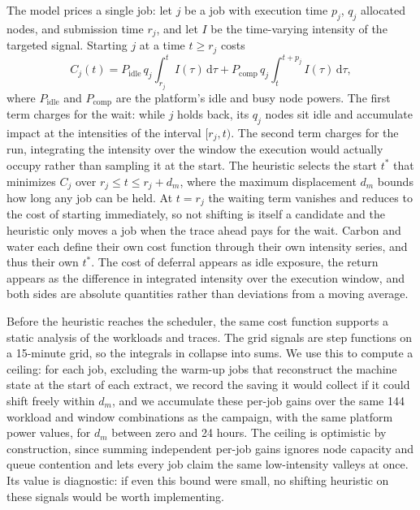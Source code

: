 The model prices a single job: let $j$ be a job with execution time $p_j$, $q_j$ allocated nodes, and submission time $r_j$, and let $I$ be the time-varying intensity of the targeted signal. Starting $j$ at a time $t \geq r_j$ costs
\begin{equation}
\label{eq:shifting-cost}
C_j(t) = P_{\text{idle}}\, q_j \int_{r_j}^{t} I(\tau)\, \mathrm{d}\tau + P_{\text{comp}}\, q_j \int_{t}^{t + p_j} I(\tau)\, \mathrm{d}\tau,
\end{equation}
where $P_{\text{idle}}$ and $P_{\text{comp}}$ are the platform's idle and busy node powers. The first term charges for the wait: while $j$ holds back, its $q_j$ nodes sit idle and accumulate impact at the intensities of the interval $[r_j, t)$. The second term charges for the run, integrating the intensity over the window the execution would actually occupy rather than sampling it at the start. The heuristic selects the start $t^*$ that minimizes $C_j$ over $r_j \leq t \leq r_j + d_m$, where the maximum displacement $d_m$ bounds how long any job can be held. At $t = r_j$ the waiting term vanishes and  reduces to the cost of starting immediately, so not shifting is itself a candidate and the heuristic only moves a job when the trace ahead pays for the wait. Carbon and water each define their own cost function through their own intensity series, and thus their own $t^*$. The cost of deferral appears as idle exposure, the return appears as the difference in integrated intensity over the execution window, and both sides are absolute quantities rather than deviations from a moving average.

Before the heuristic reaches the scheduler, the same cost function supports a static analysis of the workloads and traces. The grid signals are step functions on a 15-minute grid, so the integrals in  collapse into sums. We use this to compute a ceiling: for each job, excluding the warm-up jobs that reconstruct the machine state at the start of each extract, we record the saving it would collect if it could shift freely within $d_m$, and we accumulate these per-job gains over the same 144 workload and window combinations as the campaign, with the same platform power values, for $d_m$ between zero and 24 hours. The ceiling is optimistic by construction, since summing independent per-job gains ignores node capacity and queue contention and lets every job claim the same low-intensity valleys at once. Its value is diagnostic: if even this bound were small, no shifting heuristic on these signals would be worth implementing.

